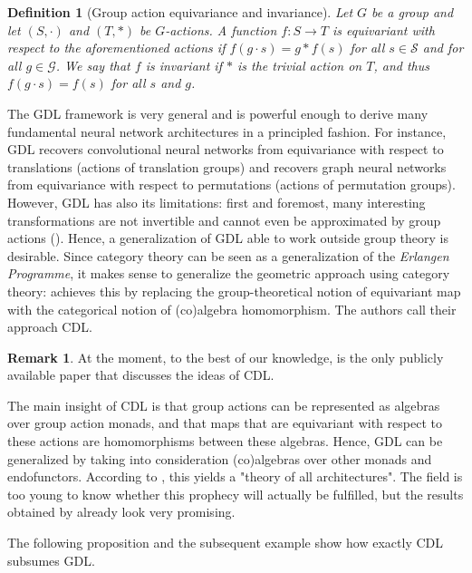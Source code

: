 \documentclass[11pt,a4paper,openright,twoside]{report}
\newcounter{mycounter}
\theoremstyle{plain}
\newtheorem{definition}[mycounter]{Definition}
\theoremstyle{definition}
\newtheorem{remark}[mycounter]{Remark}
\begin{document}
\begin{definition}[Group action equivariance and invariance]
  \label{def: equivariance}
  Let $G$ be a group and let $(S, \cdot)$ and $(T, \ast)$ be $G$-actions. A function $f: S \to T$ is equivariant with respect to the aforementioned actions if $f(g \cdot s) = g \ast f(s)$ for all $s \in \mathcal{S}$ and for all $g \in \mathcal{G}$. We say that $f$ is invariant if $\ast$ is the trivial action on $T$, and thus $f(g \cdot s) = f(s)$ for all $s$ and $g$.
\end{definition}

The GDL framework is very general and is powerful enough to derive many fundamental neural network architectures in a principled fashion.
For instance, GDL recovers convolutional neural networks from equivariance with respect to translations (actions of translation groups) and recovers graph neural networks from equivariance with respect to permutations (actions of permutation groups). However, GDL has also its limitations: first and foremost, many interesting transformations are not invertible and cannot even be approximated by group actions (\cite{gavranovicposition}). Hence, a generalization of GDL able to work outside group theory is desirable. Since category theory can be seen as a generalization of the \textit{Erlangen Programme}, it makes sense to generalize the geometric approach using category theory: \cite{gavranovicposition} achieves this by replacing the group-theoretical notion of equivariant map with the categorical notion of (co)algebra homomorphism. The authors call their approach CDL.

\begin{remark}
  At the moment, to the best of our knowledge,  \cite{gavranovicposition} is the only publicly available paper that discusses the ideas of CDL. 
\end{remark}

The main insight of CDL is that group actions can be represented as algebras over group action monads, and that maps that are equivariant with respect to these actions are homomorphisms between these algebras. Hence, GDL can be generalized by taking into consideration (co)algebras over other monads and endofunctors. According to \cite{gavranovicposition}, this yields a "theory of all architectures". The field is too young to know whether this prophecy will actually be fulfilled, but the results obtained by \cite{gavranovicposition} already look very promising.

The following proposition and the subsequent example show how exactly CDL subsumes GDL.
\end{document}
